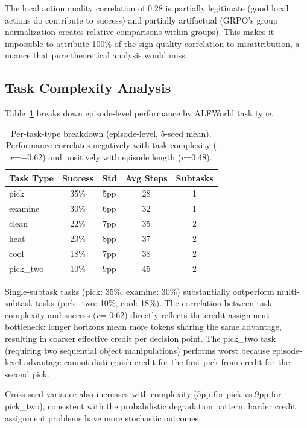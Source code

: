 \documentclass{article}
\begin{document}
The local action quality correlation of 0.28 is partially legitimate (good local actions do contribute to success) and partially artifactual (GRPO's group normalization creates relative comparisons within groups). This makes it impossible to attribute 100\% of the sign-quality correlation to misattribution, a nuance that pure theoretical analysis would miss.

\subsection{Task Complexity Analysis}

Table~\ref{tab:tasktype} breaks down episode-level performance by ALFWorld task type.

\begin{table}[h]
\centering
\caption{Per-task-type breakdown (episode-level, 5-seed mean). Performance correlates negatively with task complexity ($r$=$-$0.62) and positively with episode length ($r$=0.48).}
\label{tab:tasktype}
\begin{tabular}{lcccc}
\toprule
Task Type & Success & Std & Avg Steps & Subtasks \\
\midrule
pick & 35\% & 5pp & 28 & 1 \\
examine & 30\% & 6pp & 32 & 1 \\
clean & 22\% & 7pp & 35 & 2 \\
heat & 20\% & 8pp & 37 & 2 \\
cool & 18\% & 7pp & 38 & 2 \\
pick\_two & 10\% & 9pp & 45 & 2 \\
\bottomrule
\end{tabular}
\end{table}

Single-subtask tasks (pick: 35\%, examine: 30\%) substantially outperform multi-subtask tasks (pick\_two: 10\%, cool: 18\%). The correlation between task complexity and success ($r$=-0.62) directly reflects the credit assignment bottleneck: longer horizons mean more tokens sharing the same advantage, resulting in coarser effective credit per decision point. The pick\_two task (requiring two sequential object manipulations) performs worst because episode-level advantage cannot distinguish credit for the first pick from credit for the second pick.

Cross-seed variance also increases with complexity (5pp for pick vs 9pp for pick\_two), consistent with the probabilistic degradation pattern: harder credit assignment problems have more stochastic outcomes.
\end{document}

